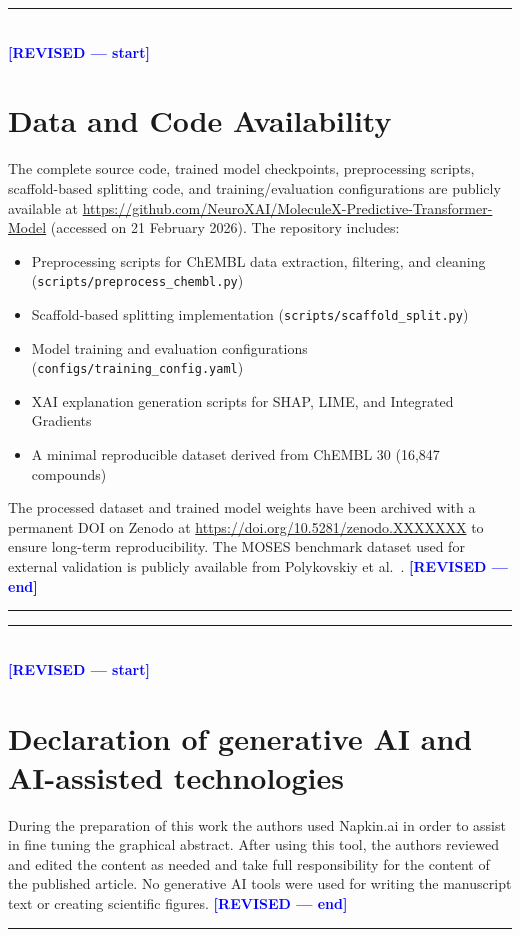 \documentclass[preprint,12pt]{elsarticle}
\newcommand{\revisedstart}{\noindent\textcolor{blue}{\rule{\textwidth}{1pt}}\\\noindent\textcolor{blue}{\textbf{[REVISED --- start]}}\vspace{0.3em}}
\newcommand{\revisedend}{\vspace{0.3em}\noindent\textcolor{blue}{\textbf{[REVISED --- end]}}\\\noindent\textcolor{blue}{\rule{\textwidth}{1pt}}\vspace{0.5em}}
\begin{document}
\clearpage
\revisedstart
\section{Data and Code Availability}

The complete source code, trained model checkpoints, preprocessing scripts, scaffold-based splitting code, and training/evaluation configurations are publicly available at \url{https://github.com/NeuroXAI/MoleculeX-Predictive-Transformer-Model} (accessed on 21 February 2026). The repository includes:

\begin{itemize}
\item Preprocessing scripts for ChEMBL data extraction, filtering, and cleaning (\texttt{scripts/preprocess\_chembl.py})
\item Scaffold-based splitting implementation (\texttt{scripts/scaffold\_split.py})
\item Model training and evaluation configurations (\texttt{configs/training\_config.yaml})
\item XAI explanation generation scripts for SHAP, LIME, and Integrated Gradients
\item A minimal reproducible dataset derived from ChEMBL 30 (16,847 compounds)
\end{itemize}

The processed dataset and trained model weights have been archived with a permanent DOI on Zenodo at \url{https://doi.org/10.5281/zenodo.XXXXXXX} to ensure long-term reproducibility. The MOSES benchmark dataset used for external validation is publicly available from Polykovskiy et al.\ \cite{polykovskiy2020molecular}.
\revisedend

\revisedstart
\section{Declaration of generative AI and AI-assisted technologies}
During the preparation of this work the authors used Napkin.ai in order to assist in fine tuning the graphical abstract. After using this tool, the authors reviewed and edited the content as needed and take full responsibility for the content of the published article. No generative AI tools were used for writing the manuscript text or creating scientific figures.
\revisedend


\appendix


  
 






\end{document}
